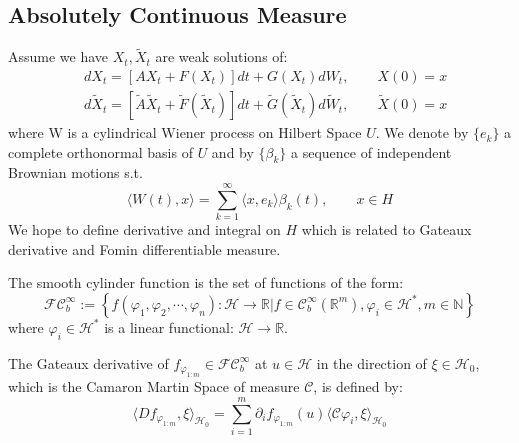 \subsection{Absolutely Continuous Measure}
Assume we have $X_t,\tilde{X}_t$ are weak solutions of:
\begin{equation}
    \begin{aligned}
        &dX_t = [AX_t + F(X_t)]dt + G(X_t)dW_t,\qquad X(0)=x\\
        &d\tilde{X}_t = [\tilde{A}\tilde{X}_t + \tilde{F}(\tilde{X}_t)]dt + \tilde{G}(\tilde{X}_t)d\tilde{W}_t,\qquad \tilde{X}(0)=x
    \end{aligned}
\end{equation}
where W is a cylindrical Wiener process on Hilbert Space $U$. We denote by $\{e_k\}$ a complete orthonormal basis of $U$ and by $\{\beta_k\}$ a sequence of independent Brownian motions s.t.
\begin{equation}
    \langle W(t), x\rangle = \sum_{k=1}^\infty \langle x, e_k\rangle \beta_k(t), \qquad x\in H
\end{equation}
We hope to define derivative and integral on $H$ which is related to Gateaux derivative and Fomin differentiable measure.
\begin{definition}
    The smooth cylinder function is the set of functions of the form:
    \begin{equation}
        \mathcal{F}\mathcal{C}_b^\infty:=\left\{f(\varphi_1, \varphi_2, \cdots, \varphi_n): \mathcal{H}\rightarrow \mathbb{R}| f\in \mathcal{C}_b^\infty(\mathbb{R}^m), \varphi_i\in \mathcal{H}^*, m\in \mathbb{N}\right\}
    \end{equation}
    where $\varphi_i \in \mathcal{H}^*$ is a linear functional: $\mathcal{H}\rightarrow \mathbb{R}$.
\end{definition}

\begin{definition}
    The Gateaux derivative of $f_{\varphi_{1:m}}\in \mathcal{F}\mathcal{C}_b^\infty$ at $u\in \mathcal{H}$ in the direction of $\xi\in \mathcal{H}_0$, which is the Camaron Martin Space of measure $\mathcal{C}$, is defined by:
    \begin{equation}
        \langle Df_{\varphi_{1:m}}, \xi\rangle_{\mathcal{H}_0} = \sum_{i=1}^m \partial_i f_{\varphi_{1:m}}(u) \langle \mathcal{C} \varphi_i, \xi\rangle_{\mathcal{H}_0}
    \end{equation}
\end{definition}





